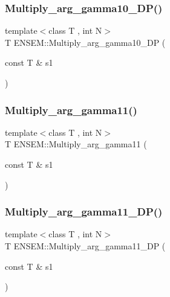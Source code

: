 \mbox{\label{namespaceENSEM_af4e553a9453429a592725dd4ab7a6b1d}} 
\subsubsection{\texorpdfstring{Multiply\_arg\_gamma10\_DP()}{Multiply\_arg\_gamma10\_DP()}}
{\footnotesize\ttfamily template$<$class T , int N$>$ \\
T E\+N\+S\+E\+M\+::\+Multiply\+\_\+arg\+\_\+gamma10\+\_\+\+DP (\begin{DoxyParamCaption}\item[{const T \&}]{s1 }\end{DoxyParamCaption})\hspace{0.3cm}{\ttfamily [inline]}}

\mbox{\label{namespaceENSEM_af82943ccca99d10c6f938ed0bf602a6c}} 
\subsubsection{\texorpdfstring{Multiply\_arg\_gamma11()}{Multiply\_arg\_gamma11()}}
{\footnotesize\ttfamily template$<$class T , int N$>$ \\
T E\+N\+S\+E\+M\+::\+Multiply\+\_\+arg\+\_\+gamma11 (\begin{DoxyParamCaption}\item[{const T \&}]{s1 }\end{DoxyParamCaption})\hspace{0.3cm}{\ttfamily [inline]}}

\mbox{\label{namespaceENSEM_acc18dd51105f008d99800a117f284872}} 
\subsubsection{\texorpdfstring{Multiply\_arg\_gamma11\_DP()}{Multiply\_arg\_gamma11\_DP()}}
{\footnotesize\ttfamily template$<$class T , int N$>$ \\
T E\+N\+S\+E\+M\+::\+Multiply\+\_\+arg\+\_\+gamma11\+\_\+\+DP (\begin{DoxyParamCaption}\item[{const T \&}]{s1 }\end{DoxyParamCaption})\hspace{0.3cm}{\ttfamily [inline]}}

